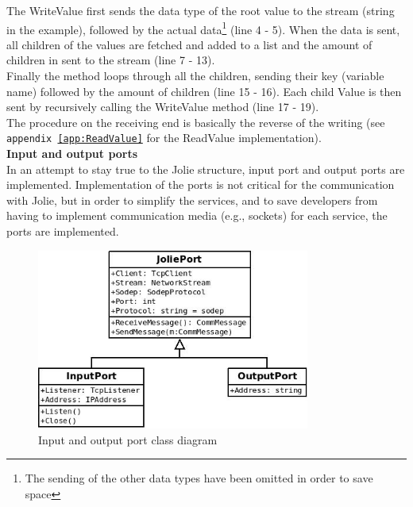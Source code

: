 \documentclass[12pt,a4paper]{article}
\begin{document}
The WriteValue first sends the data type of the root value to the stream (string in the example), followed by the actual data\footnote{The sending of the other data types have been omitted in order to save space} (line 4 - 5). When the data is sent, all children of the values are fetched and added to a list and the amount of children in sent to the stream (line 7 - 13).\\
Finally the method loops through all the children, sending their key (variable name) followed by the amount of children (line 15 - 16). Each child Value is then sent by recursively calling the WriteValue method (line 17 - 19).\\
The procedure on the receiving end is basically the reverse of the writing (see \texttt{appendix \ref{app:ReadValue}} for the ReadValue implementation). \\

\textbf{Input and output ports} \\
In an attempt to stay true to the Jolie structure, input port and output ports are implemented. Implementation of the ports is not critical for the communication with Jolie, but in order to simplify the services, and to save developers from having to implement communication media (e.g., sockets) for each service, the ports are implemented.\\

\begin{figure}[h!]
  \centering
    \includegraphics[width=0.8\textwidth]{../figures/PortClassDiagram.jpeg}
  \caption{Input and output port class diagram}
  \label{fig:portClassDiagram}
\end{figure}
\end{document}
